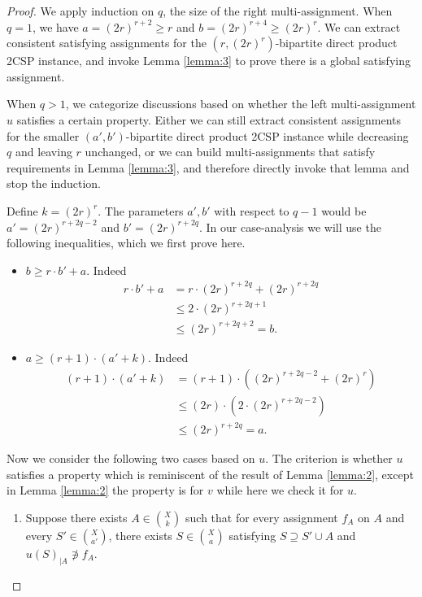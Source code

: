 \documentclass[10pt,a4paper]{article}
\begin{document}
\begin{proof}
We apply induction on $q$, the size of the right multi-assignment. When $q=1$, we have $a=(2r)^{r+2}\ge r$ and $b=(2r)^{r+4} \ge (2r)^r$. We can extract consistent satisfying assignments for the $(r,(2r)^r)$-bipartite direct product 2CSP instance, and invoke Lemma \ref{lemma:3} to prove there is a global satisfying assignment.

When $q>1$, we categorize discussions based on whether the left multi-assignment $u$ satisfies a certain property. Either we can still extract consistent assignments for the smaller $(a',b')$-bipartite direct product 2CSP instance while decreasing $q$ and leaving $r$ unchanged, or we can build multi-assignments that satisfy requirements in Lemma \ref{lemma:3}, and therefore directly invoke that lemma and stop the induction.

Define $k=(2r)^r$. The parameters $a',b'$ with respect to $q-1$ would be $a'=(2r)^{r+2q-2}$ and $b'=(2r)^{r+2q}$. In our case-analysis we will use the following inequalities, which we first prove here.

\begin{itemize}
    \item $b \ge r\cdot b'+a$.  Indeed 
    \[
    \begin{aligned}
        r\cdot b'+a & = r\cdot (2r)^{r+2q}+(2r)^{r+2q} \\
        & \le 2\cdot (2r)^{r+2q+1} \\
        & \le (2r)^{r+2q+2} =b.
    \end{aligned}
    \]
    \item $a \ge (r+1)\cdot (a'+k)$. Indeed
    \[
    \begin{aligned}
        (r+1)\cdot (a'+k) & = (r+1)\cdot ((2r)^{r+2q-2}+(2r)^r) \\
        & \le (2r)\cdot (2 \cdot (2r)^{r+2q-2}) \\
        & \le (2r)^{r+2q} = a.
    \end{aligned}
    \]
\end{itemize}

Now we consider the following two cases based on $u$. The criterion is whether $u$ satisfies a property which is reminiscent of the result of Lemma \ref{lemma:2}, except in Lemma \ref{lemma:2} the property is for $v$ while here we check it for $u$.

\begin{enumerate}
    \item Suppose there exists $A \in \binom{X}{k}$ such that for every assignment $f_A$ on $A$ and every $S' \in \binom{X}{a'}$, there exists $S \in \binom{X}{a}$ satisfying $S \supseteq S' \cup A$ and $u(S)_{|A} \not\ni f_A$.


\end{enumerate}
\end{proof}
\end{document}
